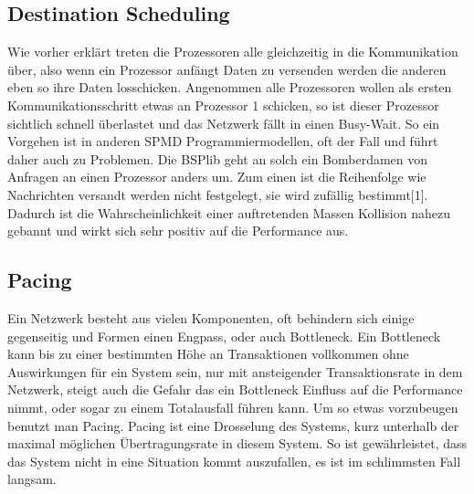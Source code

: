\documentclass[a4paper,10pt]{scrartcl}
\begin{document}
\subsection{Destination Scheduling}
Wie vorher erklärt treten die Prozessoren alle gleichzeitig in die Kommunikation über, also wenn ein Prozessor anfängt Daten zu versenden werden die anderen eben so ihre Daten losschicken. Angenommen alle Prozessoren wollen als ersten Kommunikationsschritt etwas an Prozessor 1 schicken, so ist dieser Prozessor sichtlich schnell überlastet und das Netzwerk fällt in einen Busy-Wait. So ein Vorgehen ist in anderen SPMD Programmiermodellen, oft der Fall und führt daher auch zu Problemen. Die BSPlib geht an solch ein Bomberdamen von Anfragen an einen Prozessor anders um. Zum einen ist die Reihenfolge wie Nachrichten versandt werden nicht festgelegt, sie wird zufällig bestimmt[1]. Dadurch ist die Wahrscheinlichkeit einer auftretenden Massen Kollision nahezu gebannt und wirkt sich sehr positiv auf die Performance aus.
\subsection{Pacing}
Ein Netzwerk besteht aus vielen Komponenten, oft behindern sich einige gegenseitig und Formen einen Engpass, oder auch Bottleneck. Ein Bottleneck kann bis zu einer bestimmten Höhe an Transaktionen vollkommen ohne Auswirkungen für ein System sein, nur mit ansteigender Transaktionsrate in dem Netzwerk, steigt auch die Gefahr das ein Bottleneck Einfluss auf die Performance nimmt, oder sogar zu einem Totalausfall führen kann. Um so etwas vorzubeugen benutzt man Pacing. Pacing ist eine Drosselung des Systems, kurz unterhalb der maximal möglichen Übertragungsrate in diesem System. So ist gewährleistet, dass das System nicht in eine Situation kommt auszufallen, es ist im schlimmsten Fall langsam.
\end{document}
